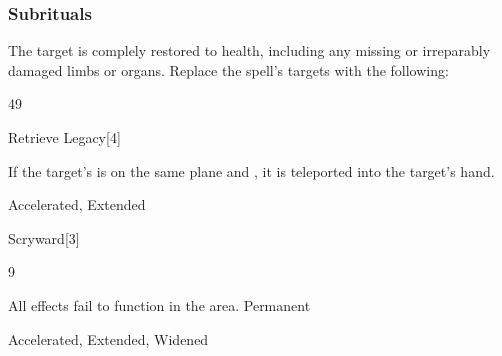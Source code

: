 \subsubsection{Subrituals}
The target is complely restored to health, including any missing or irreparably damaged limbs or organs.
Replace the spell's targets with the following:
\begin{spellcontent}
\begin{augmenttargetinginfo}
 49
\end{augmenttargetinginfo}
\end{spellcontent}
\begin{spellsection}{Retrieve Legacy}[4]
\begin{spellcontent}
\begin{spelltargetinginfo}
\end{spelltargetinginfo}
\begin{spelleffects}
\spelleffect
If the target's  is on the same plane and , it is teleported into the target's hand.
\end{spelleffects}
\end{spellcontent}
\begin{spellfooter}
 Accelerated, Extended
\end{spellfooter}
\begin{spellsubcontent}
\end{spellsubcontent}
\end{spellsection}
\begin{spellsection}{Scryward}[3]
\begin{spellcontent}
\begin{spelltargetinginfo}
 9
\end{spelltargetinginfo}
\begin{spelleffects}
\spelleffect
All  effects fail to function in the area.
\spelldur Permanent
\end{spelleffects}
\end{spellcontent}
\begin{spellfooter}
 Accelerated, Extended, Widened
\end{spellfooter}
\begin{spellsubcontent}
\end{spellsubcontent}
\end{spellsection}
